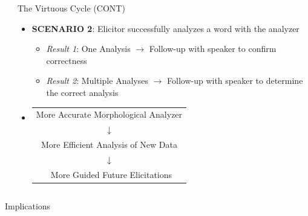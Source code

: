 \documentclass[usenames,dvipsnames]{beamer}
\begin{document}
\begin{frame}[fragile]
\begin{columns}
\begin{column}{0.3\textwidth}
\end{column}

\begin{column}{0.3\textwidth}
\begin{block}{The Virtuous Cycle ({\small CONT})}

\begin{itemize}
\setlength\itemsep{48pt}
    \item \textbf{SCENARIO 2}: Elicitor successfully analyzes a word with the analyzer
    \vspace{24pt}
    \begin{itemize}
    \setlength\itemsep{24pt}
    \item \textit{Result 1}: One Analysis $\rightarrow$ Follow-up with speaker to confirm correctness
            
    \item \textit{Result 2}: Multiple Analyses $\rightarrow$ Follow-up with speaker to determine the correct analysis
    \end{itemize}
    
    \item
    \begin{tabular}[t]{c}
    More Accurate Morphological Analyzer \\
    $\downarrow$ \\
    More Efficient Analysis of New Data \\
    $\downarrow$ \\\
    More Guided Future Elicitations
    \end{tabular}
\end{itemize}

\end{block}
\end{column}

\end{columns}

\vspace{18pt}

\begin{columns}[T]

\begin{column}{0.46\textwidth}
\begin{block}{Implications}


\end{block}
\end{column}
\end{columns}
\end{frame}
\end{document}
